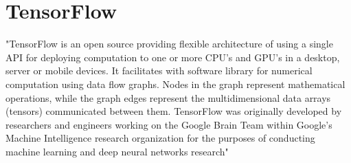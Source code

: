\section{TensorFlow}

"TensorFlow is an open source providing flexible architecture of using a single API for deploying
computation to one or more CPU’s and GPU’s in a desktop, server or mobile devices. It facilitates
with software library for numerical computation using data flow graphs. Nodes in the graph represent
mathematical operations, while the graph edges represent the multidimensional data arrays (tensors)
communicated between them. TensorFlow was originally developed by researchers and engineers working
on the Google Brain Team within Google's Machine Intelligence research organization for the 
purposes of conducting machine learning and deep neural networks research"~\cite{hid-sp18-520-TensorFlow}